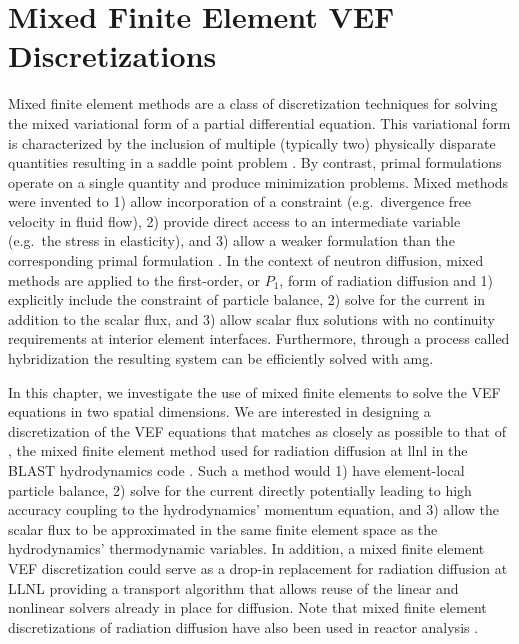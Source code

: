 \documentclass[../doc.tex]{subfiles}
\begin{document}
\chapter{Mixed Finite Element VEF Discretizations} \label{chap:rtvef}
Mixed finite element methods are a class of discretization techniques for solving the mixed variational form of a partial differential equation. This variational form is characterized by the inclusion of multiple (typically two) physically disparate quantities resulting in a saddle point problem \cite{mfem_boffi}. By contrast, primal formulations operate on a single quantity and produce minimization problems. Mixed methods were invented to 1) allow incorporation of a constraint (e.g.~divergence free velocity in fluid flow), 2) provide direct access to an intermediate variable (e.g.~the stress in elasticity), and 3) allow a weaker formulation than the corresponding primal formulation \cite{mfem_brezzi}. In the context of neutron diffusion, mixed methods are applied to the first-order, or $P_1$, form of radiation diffusion and 1) explicitly include the constraint of particle balance, 2) solve for the current in addition to the scalar flux, and 3) allow scalar flux solutions with no continuity requirements at interior element interfaces. Furthermore, through a process called hybridization \cite{https://doi.org/10.1002/nme.339,doi:10.1137/17M1132562} the resulting system can be efficiently solved with \gls{amg}.

In this chapter, we investigate the use of mixed finite elements to solve the VEF equations in two spatial dimensions. 
We are interested in designing a discretization of the VEF equations that matches as closely as possible to that of \textcite{pete}, the mixed finite element method used for radiation diffusion at \gls{llnl} in the BLAST hydrodynamics code \cite{blast}. Such a method would 1) have element-local particle balance, 2) solve for the current directly potentially leading to high accuracy coupling to the hydrodynamics' momentum equation, and 3) allow the scalar flux to be approximated in the same finite element space as the hydrodynamics' thermodynamic variables. In addition, a mixed finite element VEF discretization could serve as a drop-in replacement for radiation diffusion at LLNL providing a transport algorithm that allows reuse of the linear and nonlinear solvers already in place for diffusion. Note that mixed finite element discretizations of radiation diffusion have also been used in reactor analysis \cite{mfem_diffusion,doi:10.13182/NSE97-A28593,doi:10.13182/NSE07-A2660}. 
\end{document}
